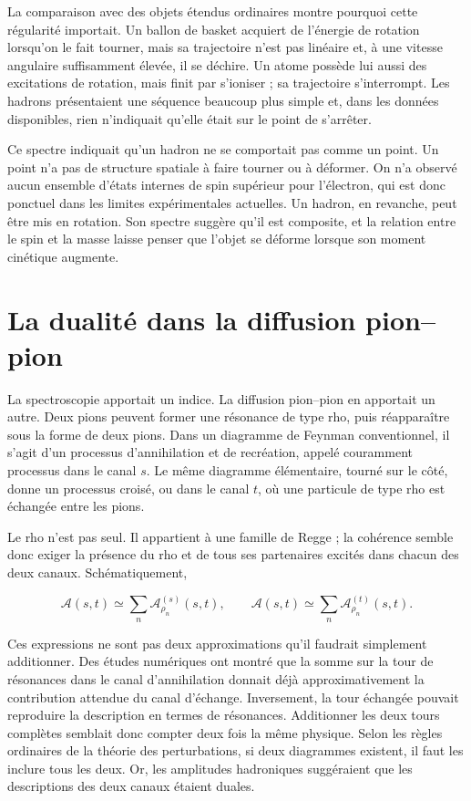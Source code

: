 La comparaison avec des objets étendus ordinaires montre pourquoi cette régularité importait. Un ballon de basket acquiert de l’énergie de rotation lorsqu’on le fait tourner, mais sa trajectoire n’est pas linéaire et, à une vitesse angulaire suffisamment élevée, il se déchire. Un atome possède lui aussi des excitations de rotation, mais finit par s’ioniser ; sa trajectoire s’interrompt. Les hadrons présentaient une séquence beaucoup plus simple et, dans les données disponibles, rien n’indiquait qu’elle était sur le point de s’arrêter.

Ce spectre indiquait qu’un hadron ne se comportait pas comme un point. Un point n’a pas de structure spatiale à faire tourner ou à déformer. On n’a observé aucun ensemble d’états internes de spin supérieur pour l’électron, qui est donc ponctuel dans les limites expérimentales actuelles. Un hadron, en revanche, peut être mis en rotation. Son spectre suggère qu’il est composite, et la relation entre le spin et la masse laisse penser que l’objet se déforme lorsque son moment cinétique augmente.

\section{La dualité dans la diffusion pion--pion}

La spectroscopie apportait un indice. La diffusion pion--pion en apportait un autre. Deux pions peuvent former une résonance de type rho, puis réapparaître sous la forme de deux pions. Dans un diagramme de Feynman conventionnel, il s’agit d’un processus d’annihilation et de recréation, appelé couramment processus dans le canal \(s\). Le même diagramme élémentaire, tourné sur le côté, donne un processus croisé, ou dans le canal \(t\), où une particule de type rho est échangée entre les pions.

Le rho n’est pas seul. Il appartient à une famille de Regge ; la cohérence semble donc exiger la présence du rho et de tous ses partenaires excités dans chacun des deux canaux. Schématiquement,

\begin{equation}
  \mathcal A(s,t)\simeq
  \sum_n \mathcal A^{(s)}_{\rho_n}(s,t),
  \qquad
  \mathcal A(s,t)\simeq
  \sum_n \mathcal A^{(t)}_{\rho_n}(s,t).
  \label{eq:l01-channel-sums}
\end{equation}

Ces expressions ne sont pas deux approximations qu’il faudrait simplement additionner. Des études numériques ont montré que la somme sur la tour de résonances dans le canal d’annihilation donnait déjà approximativement la contribution attendue du canal d’échange. Inversement, la tour échangée pouvait reproduire la description en termes de résonances. Additionner les deux tours complètes semblait donc compter deux fois la même physique. Selon les règles ordinaires de la théorie des perturbations, si deux diagrammes existent, il faut les inclure tous les deux. Or, les amplitudes hadroniques suggéraient que les descriptions des deux canaux étaient duales.

